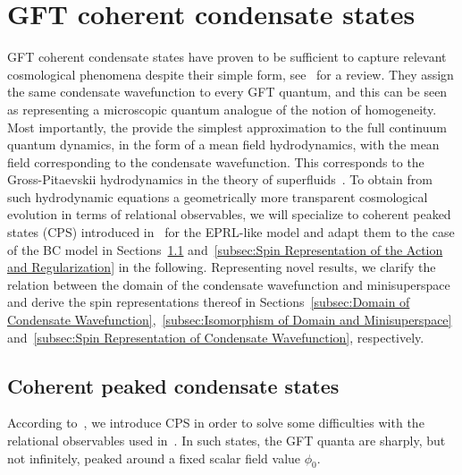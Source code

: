 \documentclass[11pt,a4paper]{article}
\begin{document}
\section{GFT coherent condensate states}\label{sec:GFT Condensates}

GFT coherent condensate states have proven to be sufficient to capture relevant cosmological phenomena despite their simple form, see~\cite{Pithis:2019tvp} for a review. They assign the same condensate wavefunction to every GFT quantum, and this can be seen as representing a microscopic quantum analogue of the notion of homogeneity. Most importantly, the provide the simplest approximation to the full continuum quantum dynamics, in the form of a mean field hydrodynamics, with the mean field corresponding to the condensate wavefunction. This corresponds to the Gross-Pitaevskii hydrodynamics in the theory of superfluids~\cite{pitaevskii2016bose}. To obtain from such hydrodynamic equations a geometrically more transparent cosmological evolution in terms of relational observables, we will specialize to coherent peaked states (CPS) introduced in~\cite{Marchetti:2020umh} for the EPRL-like model and adapt them to the case of the BC model in Sections~\ref{subsec:Coherent Peaked Condensate States} and~\ref{subsec:Spin Representation of the Action and Regularization} in the following. Representing novel results, we clarify the relation between the domain of the condensate wavefunction and minisuperspace and derive the spin representations thereof in Sections~\ref{subsec:Domain of Condensate Wavefunction},~\ref{subsec:Isomorphism of Domain and Minisuperspace} and~\ref{subsec:Spin Representation of Condensate Wavefunction}, respectively.

\subsection{Coherent peaked condensate states}\label{subsec:Coherent Peaked Condensate States} 

According to~\cite{Marchetti:2020umh}, we introduce CPS in order to solve some difficulties with the relational observables used in~\cite{Oriti:2016qtz}. In such states, the GFT quanta are sharply, but not infinitely, peaked around a fixed scalar field value $\phi_0$.
\end{document}
